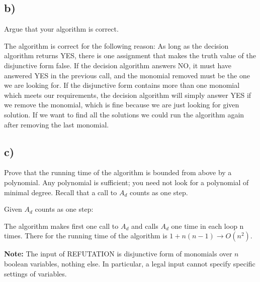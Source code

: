 \documentclass[11pt]{article}
\begin{document}
\subsection*{b)}
Argue that your algorithm is correct. \newline

The algorithm is correct for the following reason: As long as the decision algorithm returns YES, there is one assignment that makes the truth value of the disjunctive form false. If the decision algorithm answers NO, it must have answered YES in the previous call, and the monomial removed must be the one we are looking for.
If the disjunctive form contains more than one monomial which meets our requirements, the decision algorithm will simply answer YES if we remove the monomial, which is fine because we are just looking for given solution. If we want to find all the solutions we could run the algorithm again after removing the last monomial. 
  
\subsection*{c)}
Prove that the running time of the algorithm is bounded from above by a polynomial. Any polynomial is sufficient; you need not look for a polynomial of minimal degree. Recall that a call to $A_{d}$ counts as one step. \newline

Given $A_{d}$ counts as one step:

The algorithm makes first one call to $A_{d}$ and calls $A_{d}$ one time in each loop n times. There for the running time of the algorithm is $1 + n ( n - 1 ) \rightarrow O(n^2)$. \newline


\textbf{Note:} The input of REFUTATION is disjunctive form of monomials over $n$ boolean variables, nothing else. In particular, a legal input cannot specify specific settings of variables.
\end{document}
